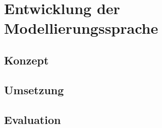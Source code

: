 \chapter{Entwicklung der Modellierungssprache}
\label{ch:Implementation}

\section{Konzept}

\section{Umsetzung}

\section{Evaluation}